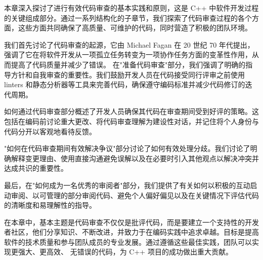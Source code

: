 本章深入探讨了进行有效代码审查的基本实践和原则，这是 C++ 中软件开发过程的关键组成部分。通过一系列结构化的子章节，我们探索了代码审查过程的各个方面，这些方面共同确保了高质量、可维护的代码，同时营造了积极的团队环境。

我们首先讨论了代码审查的起源，它由 Michael Fagan 在 20 世纪 70 年代提出，强调了它在将软件开发从一项孤立任务转变为一项协作任务方面的变革性作用，从而提高了代码质量并减少了错误。
在"准备代码审查"部分，我们强调了明确的指导方针和自我审查的重要性。我们鼓励开发人员在代码接受同行评审之前使用 linters 和静态分析器等工具来完善代码，确保遵守编码标准并减少代码修订的迭代周期。

如何通过代码审查部分概述了开发人员确保其代码在审查期间受到好评的策略。这包括在编码前讨论重大更改、将代码审查理解为建设性对话，并记住将个人身份与代码分开以客观地看待反馈。

"如何在代码审查期间有效解决争议"部分讨论了如何有效处理分歧。我们讨论了明确解释变更理由、使用直接沟通避免误解以及在必要时引入其他观点以解决冲突并达成共识的重要性。

最后，在"如何成为一名优秀的审阅者"部分，我们提供了有关如何以积极的互动启动审阅、以可管理的部分审阅代码、避免个人偏好偏见以及在关键情况下评估代码的清晰度和易理解性的指导。

在本章中，基本主题是代码审查不仅仅是批评代码，而是要建立一个支持性的开发者社区，他们分享知识、不断改进，并致力于在编码实践中追求卓越。目标是提高软件的技术质量和参与团队成员的专业发展。通过遵循这些最佳实践，团队可以实现更强大、更高效、 无错误的代码，为 C++ 项目的成功做出重大贡献。
